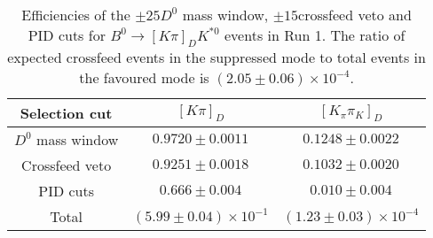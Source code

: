 \begin{table}
    \centering
    \begin{tabular}{ccc}
        \toprule
Selection cut & $[K \pi]_D$ & $[K_\pi \pi_K]_D$ \\
        \midrule
$D^0$ mass window & $0.9720 \pm 0.0011$ & $0.1248 \pm 0.0022$ \\
Crossfeed veto & $0.9251 \pm 0.0018$ & $0.1032 \pm 0.0020$ \\
PID cuts & $0.666 \pm 0.004$ & $0.010 \pm 0.004$\\
        \midrule
Total & $(5.99 \pm 0.04) \times 10^{-1}$ & $(1.23 \pm 0.03) \times 10^{-4}$\\
        \bottomrule
    \end{tabular}
    \caption{Efficiencies of the $\pm 25$\mev $D^0$ mass window, $\pm 15$\mev crossfeed veto and PID cuts for $B^0 \to [K\pi]_D K^{*0}$ events in Run 1. The ratio of expected crossfeed events in the suppressed mode to total events in the favoured mode is $(2.05 \pm 0.06) \times 10^{-4}$.}
\label{tab:double_misID_eff_Kpi_run1}
\end{table}
